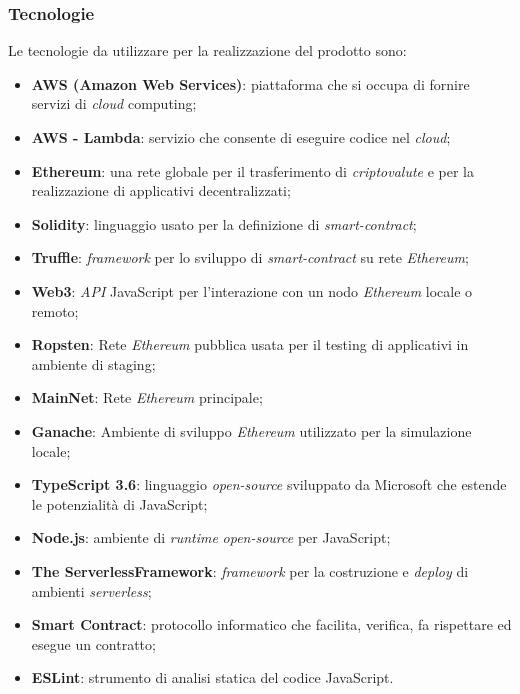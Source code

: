 \subsubsection{Tecnologie}
Le tecnologie da utilizzare per la realizzazione del prodotto sono:
\begin{itemize}
	\item \textbf{AWS (Amazon Web Services)}: piattaforma che si occupa di fornire servizi di \textit{cloud\glo} computing;
	\item \textbf{AWS - Lambda}: servizio che consente di eseguire codice nel \textit{cloud\glos};
	\item \textbf{Ethereum\glos}: una rete globale per il trasferimento di \textit{criptovalute\glo} e per la realizzazione di applicativi decentralizzati;
	\item \textbf{Solidity}: linguaggio usato per la definizione di \textit{smart-contract\glos};
	\item \textbf{Truffle}: \textit{framework\glo} per lo sviluppo di \textit{smart-contract\glo} su rete \textit{Ethereum\glos};
	\item \textbf{Web3}: \textit{API\glo} JavaScript per l'interazione con un nodo \textit{Ethereum\glo} locale o remoto;
	\item \textbf{Ropsten}: Rete \textit{Ethereum\glo} pubblica usata per il testing di applicativi in ambiente di staging;
	\item \textbf{MainNet\glos}: Rete \textit{Ethereum\glo} principale;
	\item \textbf{Ganache}: Ambiente di sviluppo \textit{Ethereum\glo} utilizzato per la simulazione locale;
	\item \textbf{TypeScript 3.6}:  linguaggio \textit{open-source\glo} sviluppato da Microsoft che estende le potenzialità di JavaScript;
	\item \textbf{Node.js}: ambiente di \textit{runtime\glo} \textit{open-source\glo} per JavaScript;
	\item \textbf{The Serverless\glo Framework\glos}: \textit{framework\glo} per la costruzione e \textit{deploy\glo}  di ambienti \textit{serverless\glos};
	\item \textbf{Smart Contract\glos}: protocollo informatico che facilita, verifica, fa rispettare ed esegue un contratto;
	\item \textbf{ESLint}: strumento di analisi statica del codice JavaScript.
\end{itemize}
